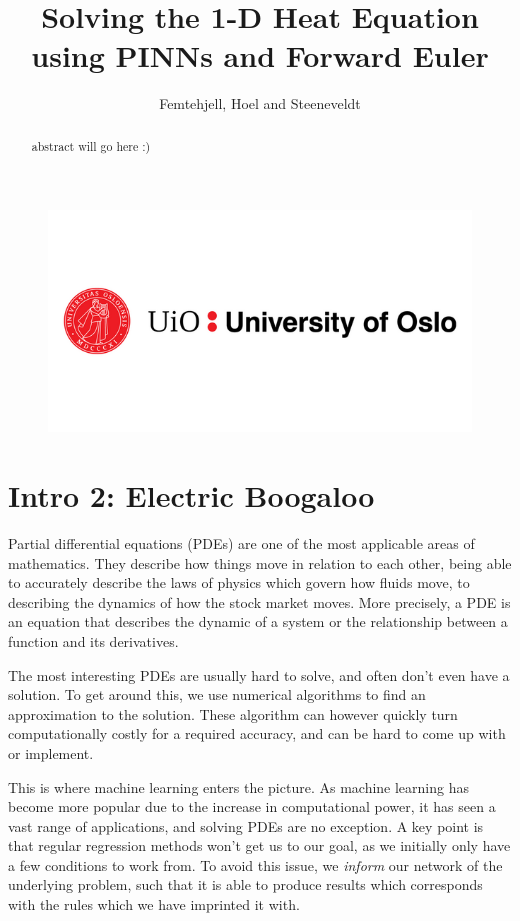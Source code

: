 \documentclass{article}
\title{Solving the 1-D Heat Equation using PINNs and Forward Euler}
\author{Femtehjell, Hoel and Steeneveldt}
\theoremstyle{definition}
\begin{document}

\maketitle
\begin{figure}[H]
    \centering
    \includegraphics[scale=0.5]{1797261_uio-logo.png}
\end{figure}
\newpage
\tableofcontents

\newpage
\listoffigures

\newpage

\begin{abstract}
    abstract will go here :)
\end{abstract}

\section{Intro 2: Electric Boogaloo}
Partial differential equations (PDEs) are one of the most applicable areas of mathematics. They describe how things move in relation to each other, being able to accurately describe the laws of physics which govern how fluids move, to describing the dynamics of how the stock market moves. More precisely, a PDE is an equation that describes the dynamic of a system or the relationship between a function and its derivatives.

The most interesting PDEs are usually hard to solve, and often don't even have a solution. To get around this, we use numerical algorithms to find an approximation to the solution. These algorithm can however quickly turn computationally costly for a required accuracy, and can be hard to come up with or implement.

This is where machine learning enters the picture. As machine learning has become more popular due to the increase in computational power, it has seen a vast range of applications, and solving PDEs are no exception. A key point is that regular regression methods won't get us to our goal, as we initially only have a few conditions to work from. To avoid this issue, we \textit{inform} our network of the underlying problem, such that it is able to produce results which corresponds with the rules which we have imprinted it with.
\end{document}
